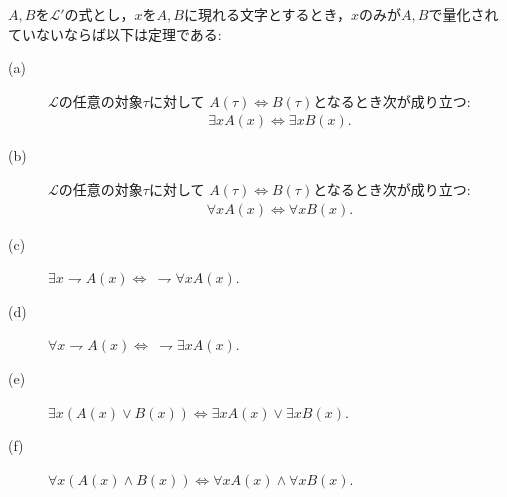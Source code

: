 	
	\begin{screen}
		\begin{metathm}[量化記号の諸性質]\label{metathm:properties_of_quantifiers}
			$A,B$を$\mathcal{L}'$の式とし，$x$を$A,B$に現れる文字とするとき，$x$のみが$A,B$で量化されていないならば以下は定理である:
			\begin{description}
				\item[(a)] $\mathcal{L}$の任意の対象$\tau$に対して
					$A(\tau) \Longleftrightarrow B(\tau)$となるとき次が成り立つ:
					\begin{align}
						\exists x A(x) \Longleftrightarrow \exists x B(x).
					\end{align}
				
				\item[(b)] $\mathcal{L}$の任意の対象$\tau$に対して
					$A(\tau) \Longleftrightarrow B(\tau)$となるとき次が成り立つ:
					\begin{align}
						\forall x A(x) \Longleftrightarrow \forall x B(x).
					\end{align}
					
				\item[(c)] $\exists x \rightharpoondown A(x) \Longleftrightarrow\ \rightharpoondown \forall x A(x)$.
				
				\item[(d)] $\forall x \rightharpoondown A(x) \Longleftrightarrow\ \rightharpoondown \exists x A(x)$.
				
				\item[(e)] $\exists x ( A(x) \vee B(x) ) \Longleftrightarrow \exists x A(x) \vee \exists x B(x)$.
				
				\item[(f)] $\forall x ( A(x) \wedge B(x) ) \Longleftrightarrow \forall x A(x) \wedge \forall x B(x)$.
			\end{description}
		\end{metathm}
	\end{screen}
	
